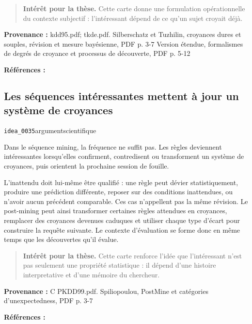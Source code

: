 \documentclass[10pt,a4paper]{article}
\begin{document}
\begin{quote}
\textbf{Intérêt pour la thèse.} Cette carte donne une formulation opérationnelle du contexte subjectif : l'intéressant dépend de ce qu'un sujet croyait déjà.
\end{quote}
{\footnotesize\color{metadata}\textbf{Provenance :} kdd95.pdf; tkde.pdf. Silberschatz et Tuzhilin, croyances dures et souples, révision et mesure bayésienne, PDF p. 3-7 Version étendue, formalismes de degrés de croyance et processus de découverte, PDF p. 5-12\par}
{\footnotesize\color{metadata}\textbf{Références :} \parencite{silberschatz1995subjective,silberschatz1996patterns}\par}

\subsection{Les séquences intéressantes mettent à jour un système de croyances}
{\small\color{metadata} \texttt{idea\_0035}\quad\textbullet\quad argument\quad\textbullet\quad scientifique\par}

Dans le séquence mining, la fréquence ne suffit pas. Les règles deviennent intéressantes lorsqu'elles confirment, contredisent ou transforment un système de croyances, puis orientent la prochaine session de fouille.

L'inattendu doit lui-même être qualifié : une règle peut dévier statistiquement, produire une prédiction différente, reposer sur des conditions inattendues, ou n'avoir aucun précédent comparable. Ces cas n'appellent pas la même révision. Le post-mining peut ainsi transformer certaines règles attendues en croyances, remplacer des croyances devenues caduques et utiliser chaque type d'écart pour construire la requête suivante. Le contexte d'évaluation se forme donc en même temps que les découvertes qu'il évalue.

\begin{quote}
\textbf{Intérêt pour la thèse.} Cette carte renforce l'idée que l'intéressant n'est pas seulement une propriété statistique : il dépend d'une histoire interpretative et d'une mémoire du chercheur.
\end{quote}
{\footnotesize\color{metadata}\textbf{Provenance :} C PKDD99.pdf. Spiliopoulou, PostMine et catégories d'unexpectedness, PDF p. 3-7\par}
{\footnotesize\color{metadata}\textbf{Références :} \parencite{spiliopoulou1999rules}\par}
\end{document}
